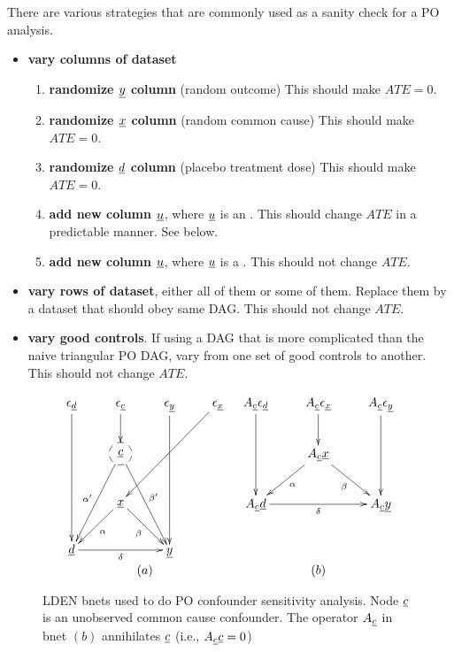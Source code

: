 There are various  strategies that are commonly
used
as a sanity check for a
PO analysis.
\begin{itemize}
\item {\bf vary columns of dataset}
\begin{enumerate}
\item {\bf randomize $\rvy$ column} (random outcome) This should make $ATE=0$.
\item {\bf randomize $\rvx$ column}
(random common cause) This should make $ATE=0$.
\item {\bf randomize $\rvd$ column} (placebo treatment dose) This should make $ATE=0$.
\item {\bf add new column $\rvu$}, where $\rvu$ is an .
This should change $ATE$
in a predictable manner. See below.
\item {\bf add new column $\rvu$}, where $\rvu$ is a .
This should not change $ATE$.
\end{enumerate}
\item {\bf vary rows of dataset},
either all of them or some of them.
Replace them by a dataset that
should obey same DAG.
This should not change $ATE$.
\item {\bf vary good controls}. If using
a DAG that is more complicated than the
naive triangular PO DAG,
vary from one set of good
controls to another.
This should not change $ATE$.

\end{itemize}


\begin{figure}[h!]
$$
\begin{array}{cc}
\xymatrix{
\eps_\rvd\ar[ddd]
&\eps_\rvc\ar[d]
&\eps_\rvy\ar[ddd]
&\eps_\rvx\ar[lldd]
\\
&*++[F-o]{\rvc}\ar[ldd]_{\alp'}
\ar[rdd]^{\beta'}
\\
&\rvx
\ar[ld]^\alp
\ar[rd]_\beta
\\
\rvd\ar[rr]_\delta
&&\rvy
}
&
\xymatrix{
A_\rvc\eps_\rvd\ar[dd]
&A_\rvc\eps_\rvx\ar[d]
&A_\rvc\eps_\rvy\ar[dd]
\\
&A_\rvc\rvx
\ar[ld]^\alp
\ar[rd]_\beta
\\
A_\rvc\rvd\ar[rr]_\delta
&&A_\rvc\rvy
}
\\
(a)&(b)
\end{array}
$$
\caption{LDEN bnets used to do PO confounder
sensitivity analysis.
Node $\rvc$
is an unobserved common cause confounder.
The operator $A_\rvc$ in bnet $(b)$ annihilates $\rvc$ (i.e., $A_\rvc \rvc =0$)}
\label{eq-po-sen-ana}
\end{figure}

